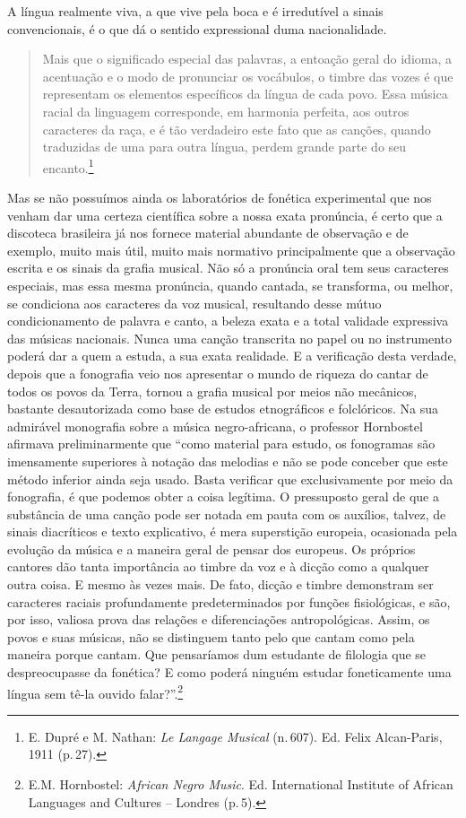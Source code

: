 A língua realmente viva, a que vive pela boca e é irredutível a sinais
convencionais, é o que dá o sentido expressional duma nacionalidade.

\begin{quote}%
\small{Mais que o significado especial das palavras, a entoação geral do
idioma, a acentuação e o modo de pronunciar os vocábulos, o timbre das
vozes é que representam os elementos específicos da língua de cada povo.
Essa música racial da linguagem corresponde, em harmonia perfeita, aos
outros caracteres da raça, e é tão verdadeiro este fato que as canções,
quando traduzidas de uma para outra língua, perdem grande parte do seu
encanto.}\footnote{E. Dupré e M. Nathan: \textit{Le Langage Musical} (n.\,607). Ed. Felix Alcan-Paris, 1911 (p.\,27).}
\end{quote}

Mas se não possuímos ainda os laboratórios de fonética experimental que
nos venham dar uma certeza científica sobre a nossa exata pronúncia, é
certo que a discoteca brasileira já nos fornece material abundante de
observação e de exemplo, muito mais útil, muito mais normativo
principalmente que a observação escrita e os sinais da grafia musical.
Não só a pronúncia oral tem seus caracteres especiais, mas essa mesma
pronúncia, quando cantada, se transforma, ou melhor, se condiciona aos
caracteres da voz musical, resultando desse mútuo condicionamento de
palavra e canto, a beleza exata e a total validade expressiva das
músicas nacionais. Nunca uma canção transcrita no papel ou no
instrumento poderá dar a quem a estuda, a sua exata realidade. E a
verificação desta verdade, depois que a fonografia veio nos apresentar o
mundo de riqueza do cantar de todos os povos da Terra, tornou a grafia
musical por meios não mecânicos, bastante desautorizada como base de
estudos etnográficos e folclóricos. Na sua admirável monografia sobre a
música negro-africana, o professor Hornbostel afirmava preliminarmente
que ``como material para estudo, os fonogramas são imensamente
superiores à notação das melodias e não se pode conceber que este método
inferior ainda seja usado. Basta verificar que exclusivamente por meio
da fonografia, é que podemos obter a coisa legítima. O pressuposto geral
de que a substância de uma canção pode ser notada em pauta com os
auxílios, talvez, de sinais diacríticos e texto explicativo, é mera
superstição europeia, ocasionada pela evolução da música e a maneira
geral de pensar dos europeus. Os próprios cantores dão tanta importância
ao timbre da voz e à dicção como a qualquer outra coisa. E mesmo às
vezes mais. De fato, dicção e timbre demonstram ser caracteres raciais
profundamente predeterminados por funções fisiológicas, e são, por isso,
valiosa prova das relações e diferenciações antropológicas. Assim, os
povos e suas músicas, não se distinguem tanto pelo que cantam como pela
maneira porque cantam. Que pensaríamos dum estudante de filologia que se
despreocupasse da fonética? E como poderá ninguém estudar foneticamente
uma língua sem tê-la ouvido falar?''.\footnote{E.M. Hornbostel: \textit{African Negro Music}. Ed. International Institute of African Languages and Cultures -- Londres (p.\,5).}

